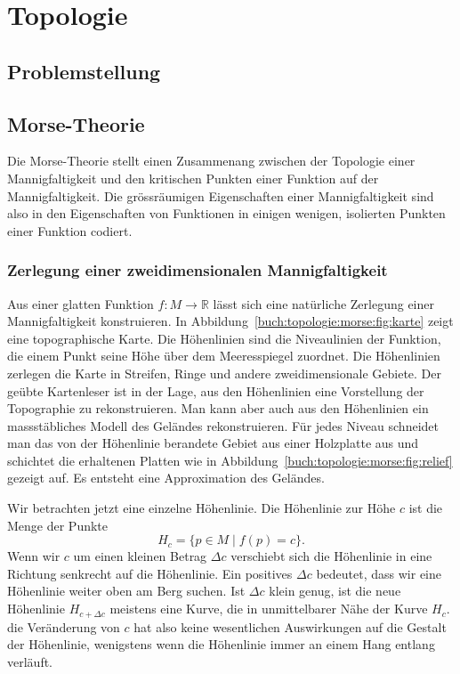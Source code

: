 %
%
%
\chapter{Topologie
\label{chapter:topologie}}

\section{Problemstellung}

\section{Morse-Theorie}
Die Morse-Theorie stellt einen Zusammenang zwischen der Topologie einer 
Mannigfaltigkeit und den kritischen Punkten einer Funktion auf der
Mannigfaltigkeit.
Die grössräumigen Eigenschaften einer Mannigfaltigkeit sind also
in den Eigenschaften von Funktionen in einigen wenigen, isolierten
Punkten einer Funktion codiert.




%
%
\subsection{Zerlegung einer zweidimensionalen Mannigfaltigkeit}
%
%
Aus einer glatten Funktion $f\colon M\to\mathbb{R}$ lässt
sich eine natürliche Zerlegung einer Mannigfaltigkeit konstruieren.
In Abbildung~\ref{buch:topologie:morse:fig:karte} zeigt eine 
topographische Karte.
Die Höhenlinien sind die Niveaulinien der Funktion, die einem
Punkt seine Höhe über dem Meeresspiegel zuordnet.
Die Höhenlinien zerlegen die Karte in Streifen, Ringe und andere
zweidimensionale Gebiete.
Der geübte Kartenleser ist in der Lage, aus den Höhenlinien eine
Vorstellung der Topographie zu rekonstruieren.
Man kann aber auch aus den Höhenlinien ein massstäbliches Modell
des Geländes rekonstruieren.
Für jedes Niveau schneidet man das von der Höhenlinie berandete Gebiet
aus einer Holzplatte aus und schichtet die erhaltenen Platten
wie in Abbildung~\ref{buch:topologie:morse:fig:relief} gezeigt
auf.
Es entsteht eine Approximation des Geländes.

Wir betrachten jetzt eine einzelne Höhenlinie.
Die Höhenlinie zur Höhe $c$ ist die Menge der Punkte
\[
H_c
=
\{ p\in M\mid f(p) = c \}.
\]
Wenn wir $c$ um einen kleinen Betrag $\Delta c$ verschiebt sich
die Höhenlinie in eine Richtung senkrecht auf die Höhenlinie.
Ein positives $\Delta c$ bedeutet, dass wir eine Höhenlinie weiter
oben am Berg suchen.
Ist $\Delta c$ klein genug, ist die neue Höhenlinie $H_{c+\Delta c}$
meistens eine Kurve, die in unmittelbarer Nähe der Kurve $H_c$.
die Veränderung von $c$ hat also keine wesentlichen Auswirkungen
auf die Gestalt der Höhenlinie, wenigstens wenn die Höhenlinie
immer an einem Hang entlang verläuft.

